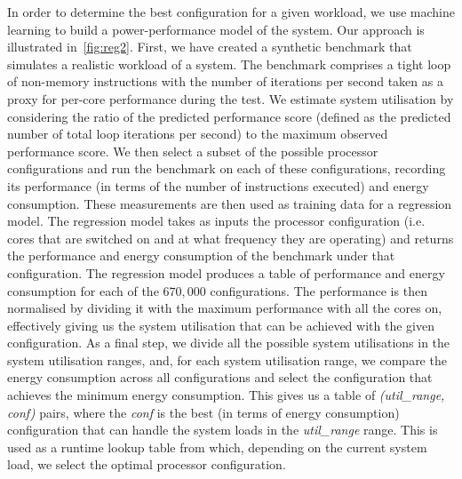 \documentclass[conference]{IEEEtran}
\begin{document}
In order to determine the best configuration for a given workload, we use machine learning to build a power-performance model of the system. Our approach is illustrated in~\cref{fig:reg2}. First, we have created a synthetic benchmark that simulates a realistic workload of a system. The benchmark comprises a tight loop of non-memory instructions with the number of iterations per second taken as a proxy for per-core performance during the test. %
We estimate system utilisation by considering the ratio of the predicted performance score (defined as the predicted number of total loop iterations per second) to the maximum observed performance score. We then select a subset of the possible processor configurations and run the benchmark on each of these configurations, recording its performance (in terms of the number of instructions executed) and energy consumption. These measurements are then used as training data for a regression model. The regression model takes as inputs the processor configuration (i.e. cores that are switched on and at what frequency they are operating) and returns the performance and energy consumption of the benchmark under that configuration. The regression model produces a table of performance and energy consumption for each of the $670,000$ configurations. The performance is then normalised by dividing it with the maximum performance with all the cores on, effectively giving us the system utilisation that can be achieved with the given configuration. As a final step, we divide all the possible system utilisations in the system utilisation ranges, and, for each system utilisation range, we compare the energy consumption across all configurations and select the configuration that achieves the minimum energy consumption. This gives us a table of \emph{(util\_range, conf)} pairs, where the \emph{conf} is the best (in terms of energy consumption) configuration that can handle the system loads in the \emph{util\_range} range. This is used as a runtime lookup table from which, depending on the current system load, we select the optimal processor configuration. 
\end{document}

